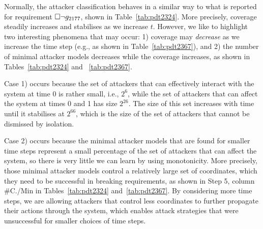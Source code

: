 {Normally, the attacker classification behaves in a similar way to what is reported for requirement $ {{\square}} \lnot g_{2177}$, shown in Table~\ref{tab:pdt2324}. More precisely, coverage steadily increases and stabilises as we increase $t$. However, we like to highlight two interesting phenomena that may occur: 1) coverage {may} \emph{decrease} as we increase the time step (e.g., as shown in Table~\ref{tab:pdt2367}), and 2) the number of minimal attacker models decreases while the coverage increases, as shown in Tables~\ref{tab:pdt2324} and ~\ref{tab:pdt2367}. 


Case 1) occurs because the set of attackers that can effectively interact with the system at time 0 is rather small, i.e., $2^6$, while the set of attackers that can affect the system at times 0 and 1 has size $2^{26}$. The size of this set increases with time until it stabilises at $2^{66}$, which is the size of the set of attackers that cannot be dismissed by isolation. 

Case 2) occurs because the minimal attacker models that are found for smaller time steps represent a small percentage of the set of attackers that can affect the system, so there is very little we can learn by using monotonicity. More precisely, those minimal attacker models control a relatively large set of coordinates, which they need to be successful in breaking requirements, as shown in Step 5, column \#C./Min in Tables~\ref{tab:pdt2324} and~\ref{tab:pdt2367}. By considering more time steps, we are allowing attackers that control less coordinates to further propagate their actions through the system, which enables attack strategies that were unsuccessful for smaller choices of time steps.

}
